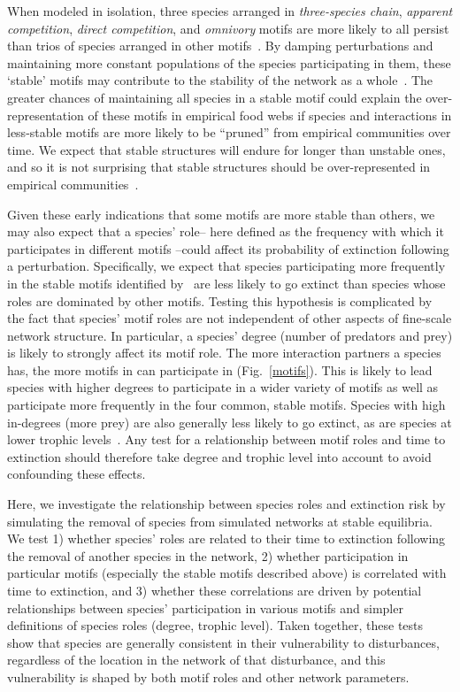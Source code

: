 \documentclass[12pt]{article}
\begin{document}
	When modeled in isolation, three species arranged in \emph{three-species chain}, \emph{apparent competition}, \emph{direct competition}, and \emph{omnivory} motifs are more likely to all persist than trios of species arranged in other motifs~\citep{Borrelli2015a}.
	By damping perturbations and maintaining more constant populations of the species participating in them, these `stable' motifs may contribute to the stability of the network as a whole~\citep{Borrelli2015a}. 
    The greater chances of maintaining all species in a stable motif could explain the over-representation of these motifs in empirical food webs if species and interactions in less-stable motifs are more likely to be ``pruned'' from empirical communities over time. We expect that stable structures will endure for longer than unstable ones, and so it is not surprising that stable structures should be over-represented in empirical communities~\citep{Borrelli2015}.


	Given these early indications that some motifs are more stable than others, we may also expect that a species' role-- here defined as the frequency with which it participates in different motifs --could affect its probability of extinction following a perturbation.
	Specifically, we expect that species participating more frequently in the stable motifs identified by~\citet{Borrelli2015a} are less likely to go extinct than species whose roles are dominated by other motifs.
	Testing this hypothesis is complicated by the fact that species' motif roles are not independent of other aspects of fine-scale network structure. 
    In particular, a species' degree (number of predators and prey) is likely to strongly affect its motif role.
    The more interaction partners a species has, the more motifs in can participate in (Fig.~\ref{motifs}).
    This is likely to lead species with higher degrees to participate in a wider variety of motifs as well as participate more frequently in the four common, stable motifs.
    Species with high in-degrees (more prey) are also generally less likely to go extinct, as are species at lower trophic levels~\citep{Cirtwill2018FoodWebs}.
    Any test for a relationship between motif roles and time to extinction should therefore take degree and trophic level into account to avoid confounding these effects.  
    
    
    Here, we investigate the relationship between species roles and extinction risk by simulating the removal of species from simulated networks at stable equilibria. We test 1) whether species' roles are related to their time to extinction following the removal of another species in the network, 2) whether participation in particular motifs (especially the stable motifs described above) is correlated with time to extinction, and 3) whether these correlations are driven by potential relationships between species' participation in various motifs and simpler definitions of species roles (degree, trophic level). Taken together, these tests show that species are generally consistent in their vulnerability to disturbances, regardless of the location in the network of that disturbance, and this vulnerability is shaped by both motif roles and other network parameters.
\end{document}
